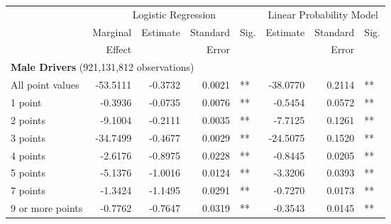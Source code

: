 
\begin{table}%
\centering 
\begin{tabular}{l r r r l r r l} 

\hline 
 
 & \multicolumn{4}{c}{Logistic Regression}  & \multicolumn{3}{c}{Linear Probability Model} \\ 

 \cmidrule(lr){2-5}\cmidrule(lr){6-8} 
 & Marginal & Estimate & Standard & Sig. & Estimate & Standard & Sig. \\ 
 &   Effect &          &  Error   &      &          &  Error   &     \\ 

\hline 
 
\multicolumn{7}{l}{\textbf{Male Drivers} (921,131,812 observations)} \\ 

All point values                &  -53.5111       &  -0.3732        &  0.0021       &   **       &  -38.0770        &  0.2114       &   **       \\ 
1 point                         &  -0.3936       &  -0.0735        &  0.0076       &   **       &  -0.5454        &  0.0572       &   **       \\ 
2 points                        &  -9.1004       &  -0.2111        &  0.0035       &   **       &  -7.7125        &  0.1261       &   **       \\ 
3 points                        &  -34.7499       &  -0.4677        &  0.0029       &   **       &  -24.5075        &  0.1520       &   **       \\ 
4 points                        &  -2.6176       &  -0.8975        &  0.0228       &   **       &  -0.8445        &  0.0205       &   **       \\ 
5 points                        &  -5.1376       &  -1.0016        &  0.0124       &   **       &  -3.3206        &  0.0393       &   **       \\ 
7 points                        &  -1.3424       &  -1.1495        &  0.0291       &   **       &  -0.7270        &  0.0173       &   **       \\ 
9 or more points                &  -0.7762       &  -0.7647        &  0.0319       &   **       &  -0.3543        &  0.0145       &   **       \\ 


\end{tabular}
\end{table}
